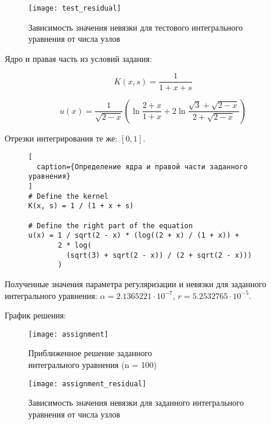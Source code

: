 \begin{figure}[h!]
  \centering
  \texttt{[image: test\_residual]}
  \caption{Зависимость значения невязки для тестового интегрального уравнения от числа узлов}
\end{figure}

\newpage

Ядро и правая часть из условий задания:

\begin{equation}
  K(x, s) = \frac{1}{1 + x + s}
\end{equation}

\begin{equation}
  u(x) = \frac{1}{\sqrt{2 - x}} \left( \ln{\frac{2 + x}{1 + x}} + 2 \ln{\frac{\sqrt{3} + \sqrt{2 - x}}{2 + \sqrt{2 - x}}} \right)
\end{equation}

Отрезки интегрирования те же: $ [0, 1] $.

\captionsetup{justification=justified}

\begin{figure}[h!]
\begin{lstlisting}[
  caption={Определение ядра и правой части заданного уравнения}
]
# Define the kernel
K(x, s) = 1 / (1 + x + s)

# Define the right part of the equation
u(x) = 1 / sqrt(2 - x) * (log((2 + x) / (1 + x)) +
       2 * log(
         (sqrt(3) + sqrt(2 - x)) / (2 + sqrt(2 - x)))
       )
\end{lstlisting}
\end{figure}

Полученные значения параметра регуляризации и невязки для заданного интегрального уравнения: $ \alpha = 2.1365221 \cdot 10^{-7} $,
$ r = 5.2532765 \cdot 10^{-5} $. \npar

График решения:

\captionsetup{justification=centering}

\begin{figure}[h!]
  \centering
  \texttt{[image: assignment]}
  \caption{Приближенное решение заданного \\ интегрального уравнения (n = 100)}
\end{figure}

\newpage

\begin{figure}[h!]
  \centering
  \texttt{[image: assignment\_residual]}
  \caption{Зависимость значения невязки для заданного интегрального уравнения от числа узлов}
\end{figure}


